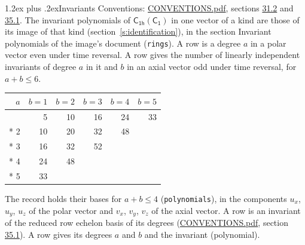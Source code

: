 \documentclass[10pt,a4paper]{article}
\makeatletter
\renewcommand\section{\@startsection{section}{1}{\z@}{-3ex plus -1ex minus -.2ex}%
  {1.2ex plus .2ex}{\normalfont\large\sffamily\bfseries\color{parttitle}}}
\numberwithin{equation}{section}
\newcommand{\grp}[1]{\mathsf{#1}}
\makeatother
\begin{document}
\section{Invariants}\label{s:invariants}
Conventions: \href{../../CONVENTIONS.pdf}{CONVENTIONS.pdf}, sections \href{../../CONVENTIONS.pdf\#conv.31.2}{31.2} and \href{../../CONVENTIONS.pdf\#conv.35.1}{35.1}.
The invariant polynomials of $\grp{C_{1h}}(\grp{C_{1}})$ in one vector of a kind are those of its image of that kind (section~\ref{s:identification}), in the section Invariant polynomials of the image's document (\texttt{rings}).
\leavevmode\label{n:index.degree.polar}\label{n:index.degree.axial}A row is a degree $a$ in a polar vector even under time reversal. A row gives the number of linearly independent invariants of degree $a$ in it and $b$ in an axial vector odd under time reversal, for $a + b \le 6$.
{\small\begin{longtable}{@{}rrrrrr@{}}\toprule
$a$ & $b = 1$ & $b = 2$ & $b = 3$ & $b = 4$ & $b = 5$\\\midrule\endhead
\bottomrule\endfoot\endlastfoot
1 & 5 & 10 & 16 & 24 & 33\\*
2 & 10 & 20 & 32 & 48 & \\*
3 & 16 & 32 & 52 &  & \\*
4 & 24 & 48 &  &  & \\*
5 & 33 &  &  &  & \\
\bottomrule\end{longtable}}
\leavevmode\label{n:local.component.polar}\label{n:local.component.axial}The record holds their bases for $a + b \le 4$ (\texttt{polynomials}), in the components $u_{x}$, $u_{y}$, $u_{z}$ of the polar vector and $v_{x}$, $v_{y}$, $v_{z}$ of the axial vector. \label{n:head.polynomial}A row is an invariant of the reduced row echelon basis of its degrees (\href{../../CONVENTIONS.pdf}{CONVENTIONS.pdf}, section \href{../../CONVENTIONS.pdf\#conv.35.1}{35.1}). A row gives its degrees $a$ and $b$ and the invariant (polynomial).
\end{document}
